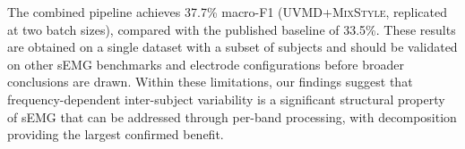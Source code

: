 \documentclass[conference]{IEEEtran}
\newcommand{\mixstyle}{\textsc{MixStyle}}
\newcommand{\uvmd}{\textsc{UVMD}}
\begin{document}
The combined pipeline achieves 37.7\% macro-F1 (\uvmd{}+\mixstyle{}, replicated at two batch sizes), compared with the published baseline of 33.5\%.
These results are obtained on a single dataset with a subset of subjects and should be validated on other sEMG benchmarks and electrode configurations before broader conclusions are drawn.
Within these limitations, our findings suggest that frequency-dependent inter-subject variability is a significant structural property of sEMG that can be addressed through per-band processing, with decomposition providing the largest confirmed benefit.


\end{document}
